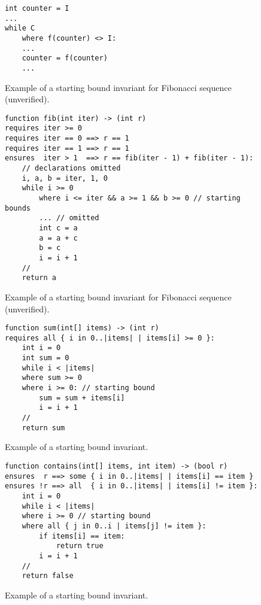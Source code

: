 \begin{figure}[ht]
\begin{lstlisting}
int counter = I
...
while C
    where f(counter) <> I:
    ... 
    counter = f(counter)
    ...
\end{lstlisting}
    \caption{Example of a starting bound invariant for Fibonacci sequence (unverified).}
\label{lst:starting-bound-gen}
\end{figure}

\begin{figure}[ht]
\begin{lstlisting}
function fib(int iter) -> (int r)
requires iter >= 0
requires iter == 0 ==> r == 1
requires iter == 1 ==> r == 1
ensures  iter > 1  ==> r == fib(iter - 1) + fib(iter - 1):
    // declarations omitted
    i, a, b = iter, 1, 0
    while i >= 0
        where i <= iter && a >= 1 && b >= 0 // starting bounds
        ... // omitted
        int c = a
        a = a + c
        b = c
        i = i + 1
    //
    return a
\end{lstlisting}
    \caption{Example of a starting bound invariant for Fibonacci sequence (unverified).}
\label{lst:starting-bound-fib}
\end{figure}

\begin{figure}[ht]
\begin{lstlisting}
function sum(int[] items) -> (int r)
requires all { i in 0..|items| | items[i] >= 0 }:
    int i = 0
    int sum = 0
    while i < |items|
    where sum >= 0
    where i >= 0: // starting bound
        sum = sum + items[i]
        i = i + 1
    //
    return sum
\end{lstlisting}
\caption{Example of a starting bound invariant.}
\label{lst:starting-bound-sum}
\end{figure}

\begin{figure}[ht]
\begin{lstlisting}
function contains(int[] items, int item) -> (bool r)
ensures  r ==> some { i in 0..|items| | items[i] == item }
ensures !r ==> all  { i in 0..|items| | items[i] != item }:
    int i = 0
    while i < |items|
    where i >= 0 // starting bound
    where all { j in 0..i | items[j] != item }:
        if items[i] == item:
            return true
        i = i + 1
    //
    return false
\end{lstlisting}
\caption{Example of a starting bound invariant.}
\label{lst:starting-bound-contains}
\end{figure}

